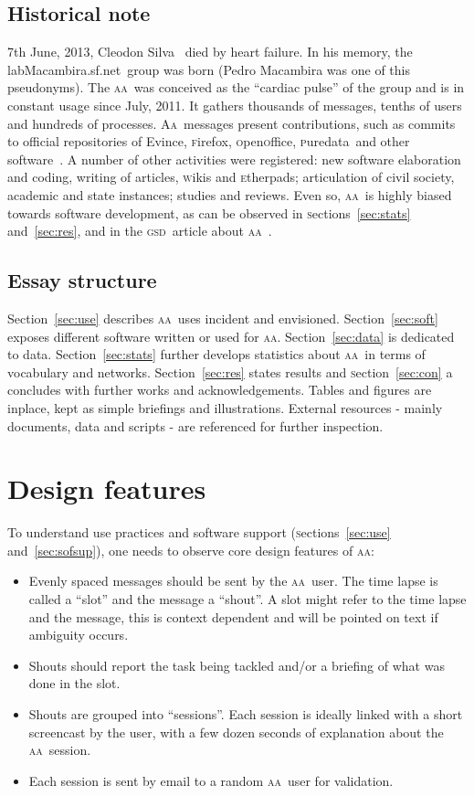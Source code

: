 \documentclass[a4paper, 11pt]{article} %
\newcommand{\firefox}{\textsc{f}irefox}
\newcommand{\openoffice}{\textsc{o}pen\textsc{o}ffice}
\newcommand{\puredata}{\textsc{p}uredata}
\newcommand{\wiki}{\textsc{w}iki}
\newcommand{\etherpad}{\textsc{e}therpad}
\newcommand{\sectionb}{\textsc{s}ection}
\newcommand{\aab}{\textsc{aa}}
\newcommand{\aai}{\textsc{Aa}}
\newcommand{\gsd}{\textsc{gsd}}
\newcommand{\lm}{lab\textsc{M}acambira.sf.net}
\begin{document}
\subsection{Historical note}
7th June, 2013, Cleodon Silva~\cite{cleodon} died by heart failure. In his memory, the \lm\ group was born (Pedro Macambira was one of this pseudonyms). The \aab\ was conceived as the ``cardiac pulse'' of the group and is in constant usage since July, 2011. It gathers thousands of messages, tenths of users and hundreds of processes. \aai\ messages present contributions, such as  commits to official repositories of Evince, \firefox, \openoffice, \puredata\ and other software~\cite{paaper}. A number of other activities were registered: new software elaboration and coding, writing of articles, \wiki s and \etherpad s; articulation of civil society, academic and state instances; studies and reviews. Even so, \aab\ is highly biased towards software development, as can be observed in \sectionb s~\ref{sec:stats} and~\ref{sec:res}, and in the \gsd\ article about \aab~\cite{paaper}.

\subsection{Essay structure}\label{sec:ess}
Section~\ref{sec:use} describes \aab\ uses incident and envisioned.
Section~\ref{sec:soft} exposes different software written or used for \aab. Section~\ref{sec:data} is dedicated to data. Section~\ref{sec:stats} further develops statistics about \aab\ in terms of vocabulary and networks. Section~\ref{sec:res} states results and \sectionb~\ref{sec:con} a concludes with further works and acknowledgements. Tables and figures are inplace, kept as simple briefings and illustrations. External resources - mainly documents, data and scripts - are referenced for further inspection.

\section{Design features}\label{sec:desf}
To understand use practices and software support (\sectionb s~\ref{sec:use} and~\ref{sec:sofsup}), one needs to observe core design features of \aab:
\begin{itemize}
    \item Evenly spaced messages should be sent by the \aab\ user. The time lapse is called a ``slot'' and the message a ``shout''. A slot might refer to the time lapse and the message, this is context dependent and will be pointed on text if ambiguity occurs.
    \item Shouts should report the task being tackled and/or a briefing of what was done in the slot.
    \item Shouts are grouped into ``sessions''. Each session is ideally linked with a short screencast by the user, with a few dozen seconds of explanation about the \aab\ session.
    \item Each session is sent by email to a random \aab\ user for validation.
\end{itemize}
\end{document}
